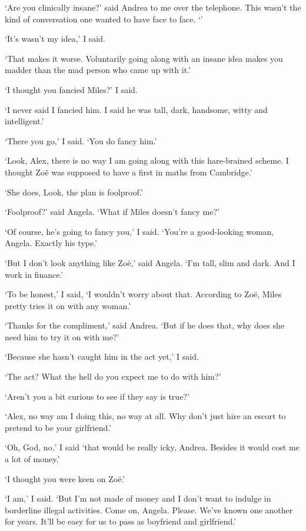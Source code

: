 `Are you clinically insane?' said Andrea to me over the telephone.
This wasn't the kind of conversation one wanted to have face to
face. `'

`It's wasn't my idea,' I said.

`That makes it worse. Voluntarily going along with an insane idea
makes you madder than the mad person who came up with it.'

`I thought you fancied Miles?' I said.

`I never said I fancied him. I said he was tall, dark, handsome,
witty and intelligent.'

`There you go,' I said. `You {\twelveit do\/} fancy him.'

`Look, Alex, there is no way I am going along with this hare-brained
scheme. I thought Zoë was supposed to have a first in maths from
Cambridge.'

`She does, Look, the plan is foolproof.'

`Foolproof?' said Angela. `What if Miles doesn't fancy me?'

`Of course, he's going to fancy you,' I said. `You're a good-looking
woman, Angela. Exactly his type.'

`But I don't look anything like Zoë,' said Angela. `I'm tall,
slim and dark. And I work in finance.'

`To be honest,' I said, `I wouldn't worry about that. According to
Zoë, Miles pretty tries it on with any woman.'

`Thanks for the compliment,' said Andrea. `But if he does that, why
does she need him to try it on with me?'

`Because she hasn't caught him in the act yet,' I said.

`The act? What the hell do you expect me to do with him?'

`Aren't you a bit curious to see if they say is true?'

`Alex, no way am I doing this, no way at all. Why don't just hire an
escort to pretend to be your girlfriend.'

`Oh, God, no,' I said `that would be really icky, Andrea. Besides it
would cost me a lot of money.'

`I thought you were keen on Zoë.'

`I am,' I said. `But I'm not made of money and I don't want to indulge in borderline illegal activities. Come on, Angela. Please. We've known one another
for years. It'll be easy for us to pass as boyfriend and
girlfriend.'

